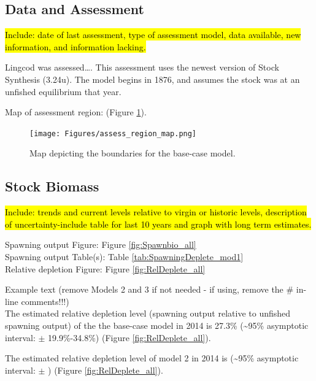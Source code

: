 \documentclass[12pt,]{article}
\begin{document}
\newpage

\subsection*{Data and Assessment}\label{data-and-assessment}

\hl{Include: date of last assessment, type of assessment model, data available, new 
information, and information lacking.}

Lingcod was assessed\ldots{}. This assessment uses the newest version of
Stock Synthesis (3.24u). The model begins in 1876, and assumes the stock
was at an unfished equilibrium that year.

Map of assessment region: (Figure \ref{fig:assess_region_map}).

\begin{figure}[htbp]
\centering
\texttt{[image: Figures/assess\_region\_map.png]}
\caption{Map depicting the boundaries for the base-case model.
\label{fig:assess_region_map}}
\end{figure}

\FloatBarrier

\subsection*{Stock Biomass}\label{stock-biomass}

\hl{Include: trends and current levels relative to virgin or historic levels, 
description of uncertainty-include table for last 10 years and graph with 
long term estimates.}

Spawning output Figure: Figure \ref{fig:Spawnbio_all}\\
Spawning output Table(s): Table \ref{tab:SpawningDeplete_mod1}\\
Relative depletion Figure: Figure \ref{fig:RelDeplete_all}

Example text (remove Models 2 and 3 if not needed - if using, remove the
\# in-line comments!!!)\\
The estimated relative depletion level (spawning output relative to
unfished spawning output) of the the base-case model in 2014 is 27.3\%
(\textasciitilde{}95\% asymptotic interval: \(\pm\) 19.9\%-34.8\%)
(Figure \ref{fig:RelDeplete_all}).

The estimated relative depletion level of model 2 in 2014 is
(\textasciitilde{}95\% asymptotic interval: \(\pm\) ) (Figure
\ref{fig:RelDeplete_all}).
\end{document}
